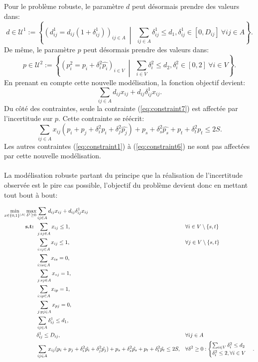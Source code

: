 \documentclass{article}
\begin{document}
Pour le problème robuste, le paramètre $d$ peut désormais prendre des valeurs dans:
\[
d \in \mathcal{U}^{1} := \left\{(d^{1}_{ij} = d_{ij}(1 + \delta^{1}_{ij}))_{ij \in A} \ \middle|\ \ \sum_{ij \in A} \delta^{1}_{ij} \leq d_1, \delta^{1}_{ij} \in [0, D_{ij}] \ \forall ij \in A\right\}.
\]
De même, le paramètre $p$ peut désormais prendre des valeurs dans:
\[
p \in \mathcal{U}^{2} := \left\{(p^{2}_{i} = p_{i} + \delta^{2}_{i} \hat{p_i})_{i \in V} \ \middle|\ \ \sum_{i \in V} \delta^{2}_{i} \leq d_2, \delta^{2}_{i} \in [0, 2] \ \forall i \in V\right\}.
\]
En prenant en compte cette nouvelle modélisation, la fonction objectif devient:
$$\sum_{ij \in A} d_{ij} x_{ij} + d_{ij} \delta_{ij}^{1} x_{ij}.$$
Du côté des contraintes, seule la contrainte (\ref{eq:constraint7}) est affectée par l'incertitude sur $p$. Cette contrainte se réécrit:
$$\sum_{ij \in A} x_{ij}(p_i + p_j + \delta_{i}^{2} \hat{p_i} + \delta_{j}^{2} \hat{p_j}) + p_s + \delta_{s}^{2} \hat{p_s} + p_t + \delta_{t}^{2} \hat{p_t} \leq 2S.$$
Les autres contraintes (\ref{eq:constraint1}) à (\ref{eq:constraint6}) ne sont pas affectées par cette nouvelle modélisation.
\\
\\
La modélisation robuste partant du principe que la réalisation de l'incertitude observée est le pire cas possible, l'objectif du problème devient donc en mettant tout bout à bout:

\begin{align}
  \min_{x \in \{0,1\}^{|A|}} \max_{\delta^{1} \geq 0} & \sum_{ij \in A} d_{ij} x_{ij} + d_{ij} \delta_{ij}^{1} x_{ij} && \notag \\
  \textbf{s.t: }  &\sum_{j: ij \in A} x_{ij} \leq 1, && \forall i \in V \setminus{\{s,t\}} \notag \\
  &\sum_{i: ij \in A} x_{ij} \leq 1, && \forall j \in V \setminus{\{s,t\}} \notag\\
  &\sum_{i: is \in A} x_{is} = 0, \notag \\
  &\sum_{j: sj \in A} x_{sj} = 1, \notag \\
  &\sum_{i: ip \in A} x_{ip} = 1, \notag \\
  &\sum_{j: pj \in A} x_{pj} = 0, \notag \\
  &\sum_{ij \in A} \delta_{ij}^{1} \leq d_1, \\
  &\delta_{ij}^{1} \leq D_{ij}, && \forall ij \in A \\
  &\sum_{ij \in A} x_{ij}(p_i + p_j + \delta_{i}^{2} \hat{p_i} + \delta_{j}^{2} \hat{p_j}) + p_s + \delta_{s}^{2} \hat{p_s} + p_t + \delta_{t}^{2} \hat{p_t} \leq 2S, && \forall \delta^{2} \geq 0: 
  \begin{cases}
    \sum_{i \in V} \delta^{2}_{i} \leq d_2 \\
    \delta^{2}_{i} \leq 2, \forall i \in V 
  \end{cases}
     \label{eq:contrainte_robuste}.
\end{align}
\end{document}
